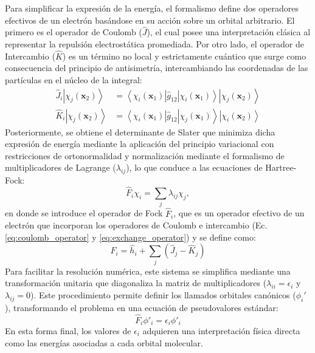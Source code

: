 Para simplificar la expresión de la energía, el formalismo define dos operadores efectivos de un electrón basándose en su acción sobre un orbital arbitrario. El primero es el operador de Coulomb ($\hat{J}$), el cual posee una interpretación clásica al representar la repulsión electrostática promediada. Por otro lado, el operador de Intercambio ($\hat{K}$) es un término no local y estrictamente cuántico que surge como consecuencia del principio de antisimetría, intercambiando las coordenadas de las partículas en el núcleo de la integral:
\begin{align}
    \hat{J}_i \left| \chi_j (\mathbf{x}_2) \right\rangle &= \left\langle \chi_i (\mathbf{x}_1) \right| \hat{g}_{12} \left| \chi_i (\mathbf{x}_1) \right\rangle \left| \chi_j (\mathbf{x}_2) \right\rangle \label{eq:coulomb_operator} \\
    \hat{K}_i \left| \chi_j (\mathbf{x}_2) \right\rangle &= \left\langle \chi_i (\mathbf{x}_1) \right| \hat{g}_{12} \left| \chi_j (\mathbf{x}_1) \right\rangle \left| \chi_i (\mathbf{x}_2) \right\rangle \label{eq:exchange_operator}
\end{align}
Posteriormente, se obtiene el determinante de Slater que minimiza dicha expresión de energía mediante la aplicación del principio variacional con restricciones de ortonormalidad y normalización mediante el formalismo de multiplicadores de Lagrange ($\lambda_{ij}$), lo que conduce a las ecuaciones de Hartree-Fock:
    \begin{equation}
        \hat{F}_i \chi_i = \sum_{j} \lambda_{ij} \chi_j,
        \label{eq:balance}
    \end{equation}
en donde se introduce el operador de Fock $\hat{F}_i$, que es un operador efectivo de un electrón que incorporan los operadores de Coulomb e intercambio (Ec. \ref{eq:coulomb_operator} y \ref{eq:exchange_operator}) y se define como:
    \begin{equation}
        \hat{F}_i = \hat{h}_i + \sum_{j} (\hat{J}_j - \hat{K}_j) 
        \label{eq:resultado}
    \end{equation}
Para facilitar la resolución numérica, este sistema se simplifica mediante una transformación unitaria que diagonaliza la matriz de multiplicadores ($\lambda_{ii} = \epsilon_i$ y $\lambda_{ij} = 0$). Este procedimiento permite definir los llamados orbitales canónicos ($\phi_i'$), transformando el problema en una ecuación de pseudovalores estándar:
\begin{equation} 
    \hat{F}_i \phi'_i = \epsilon_i \phi'_i 
    \label{eq:canonical_orbitals} 
\end{equation}
En esta forma final, los valores de $\epsilon_i$ adquieren una interpretación física directa como las energías asociadas a cada orbital molecular.

